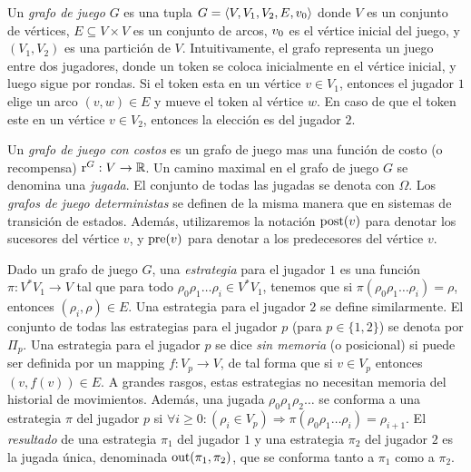 Un \emph{grafo de juego} $G$ es una tupla $G = \langle V, V_1, V_2, E, v_0 \rangle$ donde $V$ es un conjunto de vértices, $E\subseteq V \times V$ es un conjunto de arcos, $v_0$ es el vértice inicial del juego, y $(V_1, V_2)$ es una partición de $V$. Intuitivamente, el grafo representa un juego entre dos jugadores, donde un token se coloca inicialmente en el vértice inicial, y luego sigue por rondas. Si el token esta en un vértice $v \in V_1$, entonces el jugador $1$ elige un arco $(v, w) \in E$ y mueve el token al vértice $w$. En caso de que el token este en un vértice $v \in V_2$, entonces la elección es del jugador $2$.

Un \emph{grafo de juego con costos} es un grafo de juego mas una función de costo (o recompensa) $\operatorname{r}^G:V \rightarrow \mathbb{R}$. Un camino maximal en el grafo de juego $G$ se denomina una \emph{jugada}. El conjunto de todas las jugadas se denota con $\Omega$. Los \emph{grafos de juego deterministas} se definen de la misma manera que en sistemas de transición de estados. Además, utilizaremos la notación $\operatorname{post}(v)$ para denotar los sucesores del vértice $v$, y $\operatorname{pre}(v)$ para denotar a los predecesores del vértice $v$.

Dado un grafo de juego $G$, una \emph{estrategia} para el jugador $1$ es una función $\pi: V^{*} V_1 \rightarrow V$ tal que para todo  $\rho_0  \rho_1 \dots \rho_i \in V^{*} V_1$, tenemos que si $\pi(\rho_0  \rho_1\dots \rho_i) = \rho $, entonces $(\rho_i, \rho) \in E$. Una estrategia para el jugador $2$ se define similarmente. El conjunto de todas las estrategias para el jugador $p$ (para $p \in \{1,2\}$) se denota por $\Pi_{p}$.
Una estrategia para el jugador $p$ se dice \emph{sin memoria} (o posicional) si puede ser definida por un mapping $f:V_p \rightarrow V$, de tal forma que si $v \in V_p$ entonces $(v, f(v)) \in E$.
A grandes rasgos, estas estrategias no necesitan memoria del historial de movimientos. Además, una jugada $\rho_0 \rho_1 \rho_2 \dots$ se conforma a una estrategia $\pi$ del jugador $p$ si $\forall i \geq 0: (\rho_i \in V_p) \Rightarrow  \pi(\rho_0 \rho_1 \dots \rho_i) = \rho_{i+1}$. El \emph{resultado} de una estrategia $\pi_{1}$ del jugador $1$ y una estrategia $\pi_{2}$ del jugador $2$ es la jugada única, denominada $\operatorname{out}(\pi_1, \pi_2)$, que se conforma tanto a $\pi_1$ como a $\pi_2$.


